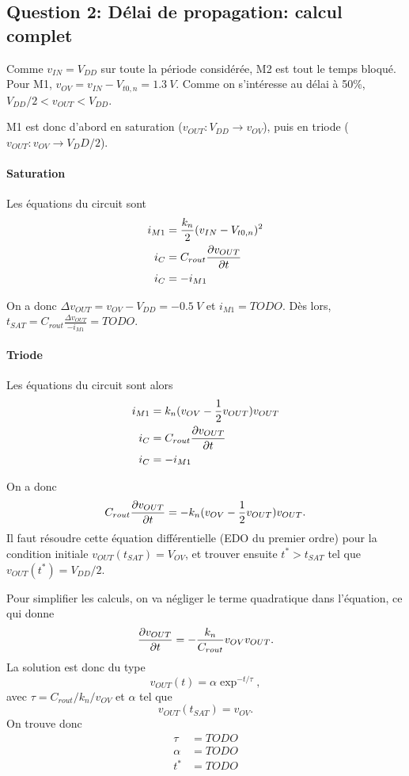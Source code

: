 \documentclass[frenchb,DIV=14]{scrartcl}
\begin{document}
\subsection*{Question 2: Délai de propagation: calcul complet}

Comme $v_{IN} = V_{DD}$ sur toute la période considérée, M2 est tout le temps
bloqué. Pour M1, $v_{OV} = v_{IN} - V_{t0,n} = \SI{1.3}{V}$.
Comme on s'intéresse au délai à 50\%, $V_{DD}/2 < v_{OUT} < V_{DD}$.

M1 est donc d'abord en saturation
($v_{OUT}: V_{DD} \rightarrow v_{OV}$), puis en triode
($v_{OUT}: v_{OV} \rightarrow V_DD/2$).

\paragraph{Saturation}

Les équations du circuit sont
\begin{align*}
    i_{M1} &= \frac{k_n}{2}(v_{IN} - V_{t0,n})^2 \\
    i_C &= C_{rout}\frac{\partial v_{OUT}}{\partial t} \\
    i_C &= -i_{M1} \\
\end{align*}

On a donc $\Delta v_{OUT} = v_{OV} - V_{DD} = \SI{-0.5}{V}$ et
$i_{M1} = TODO$.
Dès lors, $t_{SAT} = C_{rout}\frac{\Delta v_{OUT}}{-i_{M1}} = TODO$.

\paragraph{Triode}

Les équations du circuit sont alors
\begin{align*}
    i_{M1} &= k_n (v_{OV} - \frac{1}{2}v_{OUT})v_{OUT} \\
    i_C &= C_{rout}\frac{\partial v_{OUT}}{\partial t} \\
    i_C &= -i_{M1} \\
\end{align*}

On a donc
\[C_{rout}\frac{\partial v_{OUT}}{\partial t} = - k_n (v_{OV} - \frac{1}{2}v_{OUT})v_{OUT}.\]
Il faut résoudre cette équation différentielle (EDO du premier ordre) pour
la condition initiale $v_{OUT}(t_{SAT}) = V_{OV}$, et trouver ensuite
$t^* > t_{SAT}$ tel que $v_{OUT}(t^*) = V_{DD}/2$.

Pour simplifier les calculs, on va négliger le terme quadratique dans
l'équation, ce qui donne
\[\frac{\partial v_{OUT}}{\partial t} = - \frac{k_n}{C_{rout}} v_{OV} v_{OUT}.\]
La solution est donc du type
\[v_{OUT}(t) = \alpha\exp^{-t/\tau},\]
avec $\tau = C_{rout} / k_n / v_{OV}$ et $\alpha$ tel que
\[v_{OUT}(t_{SAT}) =  v_{OV}.\]
On trouve donc
\begin{align*}
    \tau &= TODO \\
    \alpha &= TODO \\
    t^* &= TODO \\
\end{align*}
\end{document}
